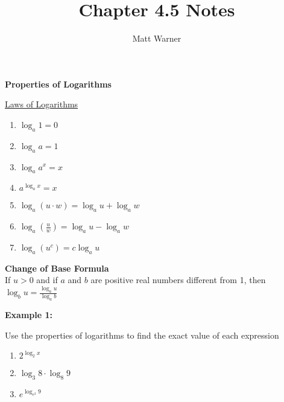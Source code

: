 \documentclass{report}
\title{\Huge{Chapter 4.5 Notes}}
\author{\huge{Matt Warner}}
\date{\huge{}}
\begin{document}
	\maketitle
\begin{LARGE}
	\begin{center}
		\textbf{Properties of Logarithms} 
	\end{center}
\end{LARGE}
\bigbreak \noindent \bigbreak \noindent
\begin{large}
	\underline{Laws of Logarithms}
 \begin{enumerate}
	 \item $\log _a 1=0$
	 \item $\log _a a=1$
	 \item $\log _a a^x=x$
	 \item $a^{\log _a x}=x$
	 \item $\log _a(u \cdot w)=\log _a u+\log _a w$
	 \item $\log _a\left(\frac{u}{w}\right)=\log _a u-\log _a w$
	 \item $\log _a\left(u^c\right)=c \log _a u$
 \end{enumerate} 
\end{large}
\bigbreak \noindent \bigbreak \noindent
\begin{large}
 \begin{center}
	 \textbf{Change of Base Formula} \\ 
	If $u > 0$ and if $a$ and $b$ are positive real numbers different from 1, then $\log_{b}u=\frac{\log_{a}u}{\log_{a}b}$
 \end{center} 
\end{large}
\bigbreak \noindent 
{}
\bigbreak \noindent \bigbreak \noindent
\begin{mdframed}
\begin{large}
  
	\textbf{Example 1:} 


	\noindent Use the properties of logarithms to find the exact value of each expression
\end{large}
	\begin{enumerate}
		\item $2^{\log _2 x}$ 
		\item $\log_{3}8 \cdot \log_{8}9$
		\item $e^{\log _{e^2} 9}$
	\end{enumerate}
\end{mdframed}
\bigbreak \noindent
\bigbreak \noindent
\end{document}
